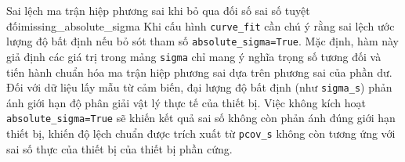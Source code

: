 
\begin{pitfall}{Sai lệch ma trận hiệp phương sai khi bỏ qua đối số sai số tuyệt đối}{missing_absolute_sigma}
Khi cấu hình \texttt{curve\_fit} cần chú ý rằng sai lệch ước lượng độ bất định nếu bỏ sót tham số \texttt{absolute\_sigma=True}. Mặc định, hàm này giả định các giá trị trong mảng \texttt{sigma} chỉ mang ý nghĩa trọng số tương đối và tiến hành chuẩn hóa ma trận hiệp phương sai dựa trên phương sai của phần dư. Đối với dữ liệu lấy mẫu từ cảm biến, đại lượng độ bất định (như \texttt{sigma\_s}) phản ánh giới hạn độ phân giải vật lý thực tế của thiết bị. Việc không kích hoạt \texttt{absolute\_sigma=True} sẽ khiến kết quả sai số không còn phản ánh đúng giới hạn thiết bị, khiến độ lệch chuẩn được trích xuất từ \texttt{pcov\_s} không còn tương ứng với sai số thực của thiết bị của thiết bị phần cứng.
\end{pitfall}